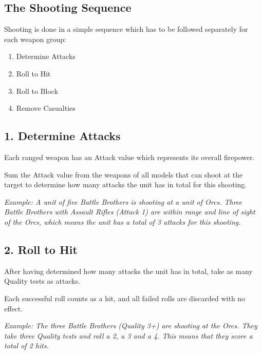 \documentclass[9pt, a4paper, bookmarks=false]{extarticle}            %
\begin{document}
\begin{multicols}{2}
\subsection{The Shooting Sequence}

Shooting is done in a simple sequence which has to be followed separately for each weapon group:

\begin{enumerate}
  \item Determine Attacks
  \item Roll to Hit
  \item Roll to Block
  \item Remove Casualties
\end{enumerate}

\columnbreak

\subsection{1. Determine Attacks}

Each ranged weapon has an Attack value which represents its overall firepower.

Sum the Attack value from the weapons of all models that can shoot at the target to determine how many attacks the unit has in total for this shooting.

\textit{Example: A unit of five Battle Brothers is shooting at a unit of Orcs. Three Battle Brothers with Assault Rifles (Attack 1) are within range and line of sight of the Orcs, which means the unit has a total of 3 attacks for this shooting.}

\subsection{2. Roll to Hit}

After having determined how many attacks the unit has in total, take as many Quality tests as attacks.

Each successful roll counts as a hit, and all failed rolls are discarded with no effect.

\textit{Example: The three Battle Brothers (Quality 3+) are shooting at the Orcs. They take three Quality tests and roll a 2, a 3 and a 4. This means that they score a total of 2 hits.}


\end{multicols}
\end{document}
